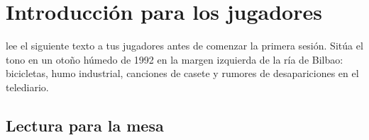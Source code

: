 \chapter{Introducción para los jugadores}

\begin{CajaSecreto}
 lee el siguiente texto a tus jugadores antes de comenzar la primera sesión. Sitúa el tono en un otoño húmedo de 1992 en la margen izquierda de la ría de Bilbao: bicicletas, humo industrial, canciones de casete y rumores de desapariciones en el telediario.
\end{CajaSecreto}

\section{Lectura para la mesa}



